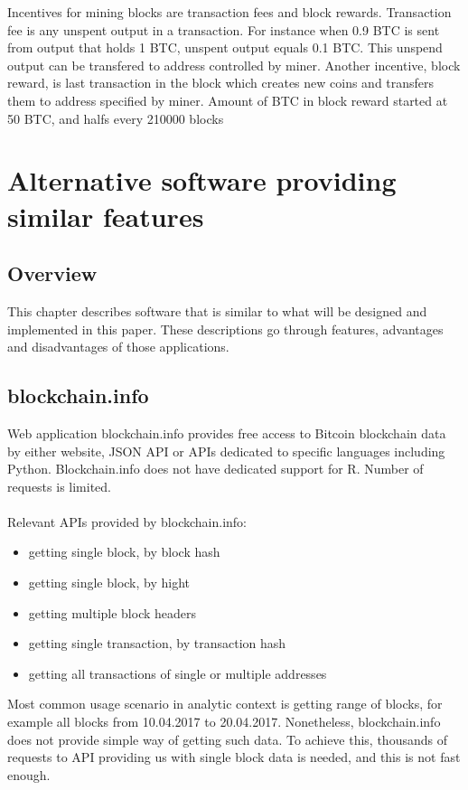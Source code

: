 \documentclass[12pt, en, eng, oneside]{mgr}
\begin{document}
Incentives for mining blocks are transaction fees and block rewards. Transaction fee is any unspent output in a transaction. For instance when 0.9 BTC is sent from output that holds 1 BTC, unspent output equals 0.1 BTC. This unspend output can be transfered to address controlled by miner.  
Another incentive, block reward, is last transaction in the block which creates new coins and transfers them to address specified by miner. Amount of BTC in block reward started at 50 BTC, and halfs every 210000 blocks \cite{currency-supply}


\chapter{Alternative software providing similar features}

\section{Overview}
This chapter describes software that is similar to what will be designed and implemented in this paper. These descriptions go through features, advantages and disadvantages of those applications. 

\section{blockchain.info}

Web application blockchain.info provides free access to Bitcoin blockchain data by either website, JSON API or APIs dedicated to specific languages including Python. Blockchain.info does not have dedicated support for R. Number of requests is limited.
\\
\\
Relevant APIs provided by blockchain.info:
\begin{itemize}
\item
getting single block, by block hash
\item
getting single block, by hight
\item
getting multiple block headers
\item
getting single transaction, by transaction hash
\item
getting all transactions of single or multiple addresses


\end{itemize}

Most common usage scenario in analytic context is getting range of blocks, for example all blocks from 10.04.2017 to 20.04.2017. Nonetheless, blockchain.info does not provide simple way of getting such data. To achieve this, thousands of requests to API providing us with single block data is needed, and this is not fast enough.
\end{document}
